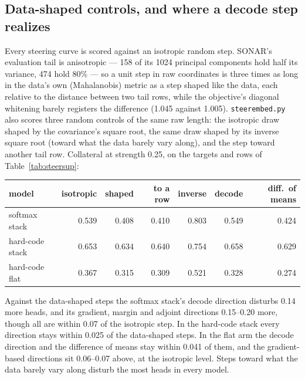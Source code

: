 \subsection{Data-shaped controls, and where a decode step realizes}
\label{sec:steernull}

Every steering curve is scored against an isotropic random step. SONAR's
evaluation tail is anisotropic --- 158 of its 1024 principal components
hold half its variance, 474 hold 80\% --- so a unit step in raw
coordinates is three times as long in the data's own (Mahalanobis) metric
as a step shaped like the data, each relative to the distance between two
tail rows, while the objective's diagonal whitening barely registers the
difference (1.045 against 1.005). \texttt{steerembed.py} also scores three
random controls of the same raw length: the isotropic draw shaped by the
covariance's square root, the same draw shaped by its inverse square root
(toward what the data barely vary along), and the step toward another
tail row. Collateral at strength 0.25, on the targets and rows of
Table~\ref{tab:steersup}:

\begin{center}\small\setlength{\tabcolsep}{4pt}
\begin{tabular}{@{}lrrrrrr@{}}
\toprule
model & isotropic & shaped & to a row & inverse & decode & diff.\ of means \\
\midrule
softmax stack   & 0.539 & 0.408 & 0.410 & 0.803 & 0.549 & 0.424 \\
hard-code stack & 0.653 & 0.634 & 0.640 & 0.754 & 0.658 & 0.629 \\
hard-code flat  & 0.367 & 0.315 & 0.309 & 0.521 & 0.328 & 0.274 \\
\bottomrule
\end{tabular}
\end{center}

Against the data-shaped steps the softmax stack's decode direction
disturbs 0.14 more heads, and its gradient, margin and adjoint directions
0.15--0.20 more, though all are within 0.07 of the isotropic step. In the
hard-code stack every direction stays within 0.025 of the data-shaped
steps. In the flat arm the decode direction and the difference of means
stay within 0.041 of them, and the gradient-based directions sit 0.06--0.07
above, at the isotropic level. Steps toward what the data barely vary
along disturb the most heads in every model.

